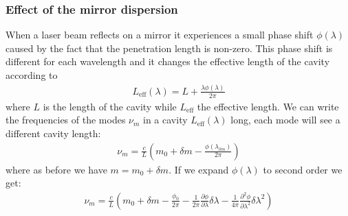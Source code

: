 \subsubsection{Effect of the mirror dispersion}
When a laser beam reflects on a mirror it experiences a small phase shift $\phi(\lambda)$ caused by the fact that the penetration length is non-zero. This phase shift is different for each wavelength and it changes the effective length of the cavity according to
\begin{align}
	L_\mathrm{eff}(\lambda) = L + \frac{\lambda \phi(\lambda)}{2\pi}
\end{align}	
where $L$ is the length of the cavity while $L_\mathrm{eff}$ the effective length.
We can write the frequencies of the modes $\nu_m$ in a cavity $L_\mathrm{eff}(\lambda)$ long, each mode will see a different cavity length:
\begin{align}
	\nu_{m} = \frac{c}{L} \left( m_0 + \delta m - \frac{\phi(\lambda_{\delta m})}{2\pi} \right)
\end{align}
where as before we have $m = m_0 +\delta m$. If we expand $\phi(\lambda)$ to second order we get:
\begin{align}
	\nu_{m} = \frac{c}{L} \left( m_0 + \delta m -\frac{\phi_0}{2\pi} -\frac{1}{2\pi} \frac{\partial\phi}{\partial\lambda} \delta\lambda - \frac{1}{4\pi} \frac{\partial^2\phi}{\partial\lambda^2} \delta\lambda^2  \right)
\end{align}

